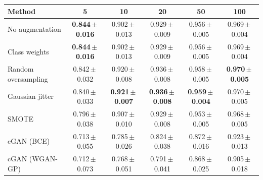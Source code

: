 \begin{tabular}{lccccc}
\toprule
\textbf{Method} & \textbf{5} & \textbf{10} & \textbf{20} & \textbf{50} & \textbf{100}\\
\midrule
No augmentation & \textbf{0.844\,$\pm$\,0.016} & 0.902\,$\pm$\,0.013 & 0.929\,$\pm$\,0.009 & 0.956\,$\pm$\,0.005 & 0.969\,$\pm$\,0.004\\
Class weights & \textbf{0.844\,$\pm$\,0.016} & 0.902\,$\pm$\,0.013 & 0.929\,$\pm$\,0.009 & 0.956\,$\pm$\,0.005 & 0.969\,$\pm$\,0.004\\
Random oversampling & 0.842\,$\pm$\,0.032 & 0.920\,$\pm$\,0.008 & 0.936\,$\pm$\,0.008 & 0.958\,$\pm$\,0.005 & \textbf{0.970\,$\pm$\,0.005}\\
Gaussian jitter & 0.840\,$\pm$\,0.033 & \textbf{0.921\,$\pm$\,0.007} & \textbf{0.936\,$\pm$\,0.008} & \textbf{0.959\,$\pm$\,0.004} & 0.970\,$\pm$\,0.005\\
SMOTE & 0.796\,$\pm$\,0.038 & 0.907\,$\pm$\,0.010 & 0.929\,$\pm$\,0.008 & 0.953\,$\pm$\,0.005 & 0.968\,$\pm$\,0.005\\
cGAN (BCE) & 0.713\,$\pm$\,0.055 & 0.785\,$\pm$\,0.026 & 0.824\,$\pm$\,0.038 & 0.872\,$\pm$\,0.016 & 0.923\,$\pm$\,0.013\\
cGAN (WGAN-GP) & 0.712\,$\pm$\,0.073 & 0.768\,$\pm$\,0.051 & 0.791\,$\pm$\,0.041 & 0.868\,$\pm$\,0.025 & 0.905\,$\pm$\,0.018\\\bottomrule
\end{tabular}
